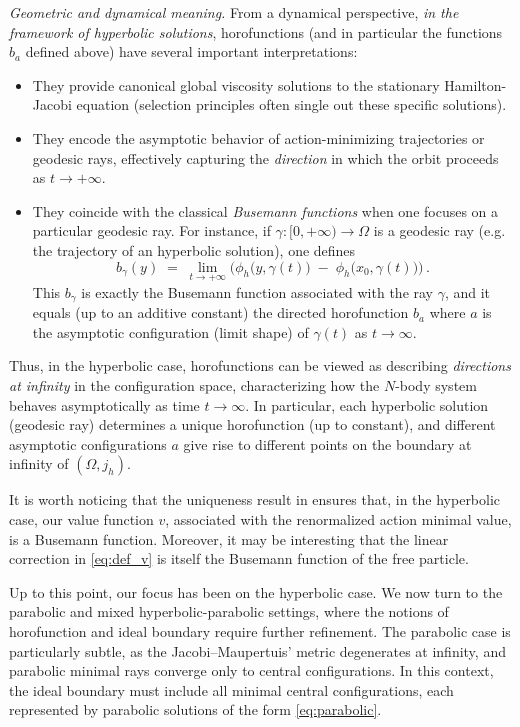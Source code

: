 \documentclass[a4paper,10pt]{amsart}
\theoremstyle{plain}
\theoremstyle{definition}
\numberwithin{equation}{section}
\numberwithin{thm}{section}
\begin{document}
{\em Geometric and dynamical meaning.} From a dynamical perspective, \emph{in the framework of hyperbolic solutions}, horofunctions (and in particular the functions $b_a$ defined above) have several important interpretations:
\begin{itemize}
\item They provide canonical global viscosity solutions to the stationary Hamilton-Jacobi equation (selection principles often single out these specific solutions).
\item They encode the asymptotic behavior of action-minimizing trajectories or geodesic rays, effectively capturing the \emph{direction} in which the orbit proceeds as $t \to +\infty$.
\item They coincide with the classical \emph{Busemann functions} when one focuses on a particular geodesic ray. For instance, if $\gamma: [0,+\infty) \to \Omega$ is a geodesic ray (e.g. the trajectory of an hyperbolic solution), one defines 
\[ 
b_\gamma(y) \;=\; \lim_{t\to+\infty}\Big(\phi_h\big(y,\gamma(t)\big)\;-\;\phi_h\big(x_0,\gamma(t)\big)\Big)\,. 
\] 
This $b_\gamma$ is exactly the Busemann function associated with the ray $\gamma$, and it equals (up to an additive constant) the directed horofunction $b_a$ where $a$ is the asymptotic configuration (limit shape) of $\gamma(t)$ as $t\to\infty$.
\end{itemize}
Thus, in the hyperbolic case, horofunctions can be viewed as describing \emph{directions at infinity} in the configuration space, characterizing how the $N$-body system behaves asymptotically as time $t \to \infty$. In particular, each hyperbolic solution (geodesic ray) determines a unique horofunction (up to constant), and different asymptotic configurations $a$ give rise to different points on the boundary at infinity of $(\Omega,j_h)$.

 It is worth noticing that the uniqueness result in \cite{MadernaVenturelli_2026} ensures that, in the hyperbolic case, our value function $v$, associated with the renormalized action minimal value,  is a Busemann function. Moreover, it may be interesting that the linear correction in \eqref{eq:def_v} is itself the Busemann function of the free particle.    
  

Up to this point, our focus has been on the hyperbolic case. We now turn to the parabolic and mixed hyperbolic-parabolic settings, where the notions of horofunction and ideal boundary require further refinement. The parabolic case is particularly subtle, as the Jacobi--Maupertuis' metric degenerates at infinity, and parabolic minimal rays converge only to central configurations. In this context, the ideal boundary must include all minimal central configurations, each represented by parabolic solutions of the form \eqref{eq:parabolic}.
\end{document}
